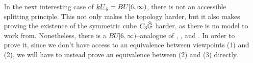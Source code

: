 In the next interesting case of $\underline{\smash{kU}}_{6} = BU[6, \infty)$, there is not an accessible splitting principle.  This not only makes the topology harder, but it also makes proving the existence of the symmetric cube $C_3 \widehat{\mathbb G}$ harder, as there is no model to work from.  Nonetheless, there is a $BU[6, \infty)$--analogue of , , and .  In order to prove it, since we don't have access to an equivalence between viewpoints (1) and (2), we will have to instead prove an equivalence between (2) and (3) directly.













